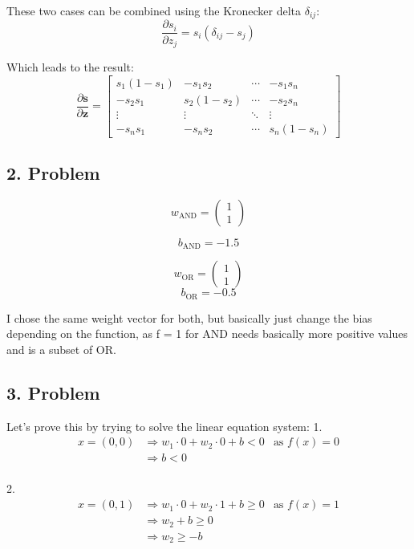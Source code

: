 \documentclass[11pt]{article}
\begin{document}
These two cases can be combined using the Kronecker delta $\delta_{ij}$:
$$\frac{\partial s_i}{\partial z_j} = s_i (\delta_{ij} - s_j)$$

Which leads to the result:
$$
\frac{\partial \mathbf{s}}{\partial \mathbf{z}}
=
\begin{bmatrix}
s_1(1 - s_1) & -s_1 s_2 & \cdots & -s_1 s_n \\
-s_2 s_1 & s_2(1 - s_2) & \cdots & -s_2 s_n \\
\vdots & \vdots & \ddots & \vdots \\
-s_n s_1 & -s_n s_2 & \cdots & s_n(1 - s_n)
\end{bmatrix}
$$

\newpage

\subsection*{2. Problem}
$$
w_{\text{AND}} =
\begin{pmatrix}
1 \\
1
\end{pmatrix}
$$

$$
b_{\text{AND}} = -1.5
$$

$$
w_{\text{OR}} =
\begin{pmatrix}
1 \\
1
\end{pmatrix}
$$
$$
b_{\text{OR}} = -0.5
$$

I chose the same weight vector for both, but basically just change the bias depending on the function, as f = 1 for AND needs basically more positive values and is a subset of OR.

\newpage

\subsection*{3. Problem}
Let's prove this by trying to solve the linear equation system:
1. 
\begin{align*}
x = (0, 0) &\Rightarrow w_1 \cdot 0 + w_2 \cdot 0 + b < 0 &\text{as } f(x) = 0 \\
&\Rightarrow b < 0 \\
\end{align*}

2.
\begin{align*}
x = (0, 1) &\Rightarrow w_1 \cdot 0 + w_2 \cdot 1 + b \geq 0 &\text{as } f(x) = 1 \\
&\Rightarrow w_2 + b \geq 0 \\
&\Rightarrow w_2 \geq -b \\
\end{align*}
\end{document}
